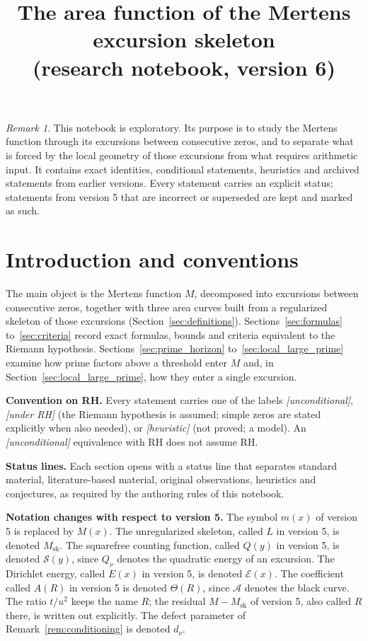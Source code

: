 \documentclass[11pt]{amsart}
\title{The area function of the Mertens excursion skeleton\\
(research notebook, version 6)}
\author{}
\date{}
\numberwithin{equation}{section}
\theoremstyle{plain}
\theoremstyle{definition}
\theoremstyle{remark}
\newtheorem{remark}[theorem]{Remark}
\newcommand{\Msk}{M_{\mathrm{sk}}}
\newcommand{\Anet}{\mathcal{A}}
\newcommand{\Sq}{\mathcal{S}}
\newcommand{\En}{\mathcal{E}}
\begin{document}
\maketitle

\tableofcontents

\bigskip

\begin{remark}
\label{rem:exploratory_nature}
This notebook is exploratory. Its purpose is to study the Mertens function
through its excursions between consecutive zeros, and to separate what is
forced by the local geometry of those excursions from what requires
arithmetic input. It contains exact identities, conditional statements,
heuristics and archived statements from earlier versions. Every statement
carries an explicit status; statements from version 5 that are incorrect or
superseded are kept and marked as such.
\end{remark}

\section{Introduction and conventions}
\label{sec:introduction}

The main object is the Mertens function $M$, decomposed into excursions
between consecutive zeros, together with three area curves built from a
regularized skeleton of those excursions
(Section~\ref{sec:definitions}). Sections~\ref{sec:formulas}
to~\ref{sec:criteria} record exact formulas, bounds and criteria equivalent
to the Riemann hypothesis. Sections~\ref{sec:prime_horizon}
to~\ref{sec:local_large_prime} examine how prime factors above a threshold
enter $M$ and, in Section~\ref{sec:local_large_prime}, how they enter a
single excursion.

\medskip
\noindent\textbf{Convention on RH.} Every statement carries one of the labels
\emph{[unconditional]}, \emph{[under RH]} (the Riemann hypothesis is assumed;
simple zeros are stated explicitly when also needed), or \emph{[heuristic]}
(not proved; a model). An \emph{[unconditional]} equivalence with RH does
not assume RH.

\medskip
\noindent\textbf{Status lines.} Each section opens with a status line that
separates standard material, literature-based material, original
observations, heuristics and conjectures, as required by the authoring rules
of this notebook.

\medskip
\noindent\textbf{Notation changes with respect to version 5.} The symbol
$m(x)$ of version 5 is replaced by $M(x)$. The unregularized skeleton, called
$L$ in version 5, is denoted $\Msk$. The squarefree counting function, called
$Q(y)$ in version 5, is denoted $\Sq(y)$, since $Q_\nu$ denotes the quadratic
energy of an excursion. The Dirichlet energy, called $E(x)$ in version 5, is
denoted $\En(x)$. The coefficient called $A(R)$ in version 5 is denoted
$\Theta(R)$, since $\Anet$ denotes the black curve. The ratio $t/u^2$ keeps
the name $R$; the residual $M-\Msk$ of version 5, also called $R$ there, is
written out explicitly. The defect parameter of
Remark~\ref{rem:conditioning} is denoted $d_\nu$.
\end{document}
